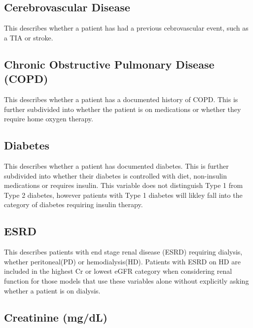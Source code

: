 \documentclass[
]{book}
\begin{document}
\hypertarget{cerebrovascular-disease}{%
\subsection{Cerebrovascular Disease}\label{cerebrovascular-disease}}

This describes whether a patient has had a previous cebrovascular event, such as a TIA or stroke.

\hypertarget{chronic-obstructive-pulmonary-disease-copd}{%
\subsection{Chronic Obstructive Pulmonary Disease (COPD)}\label{chronic-obstructive-pulmonary-disease-copd}}

This describes whether a patient has a documented history of COPD. This is further subdivided into whether the patient is on medications or whether they require home oxygen therapy.

\hypertarget{diabetes}{%
\subsection{Diabetes}\label{diabetes}}

This describes whether a patient has documented diabetes. This is further subdivided into whether their diabetes is controlled with diet, non-insulin medications or requires insulin. This variable does not distinguish Type 1 from Type 2 diabetes, however patients with Type 1 diabetes will likley fall into the category of diabetes requiring insulin therapy.

\hypertarget{esrd}{%
\subsection{ESRD}\label{esrd}}

This describes patients with end stage renal disease (ESRD) requiring dialysis, whether peritoneal(PD) or hemodialysis(HD). Patients with ESRD on HD are included in the highest Cr or lowest eGFR category when considering renal function for those models that use these variables alone without explicitly asking whether a patient is on dialysis.

\hypertarget{creatinine-mgdl}{%
\subsection{Creatinine (mg/dL)}\label{creatinine-mgdl}}
\end{document}
